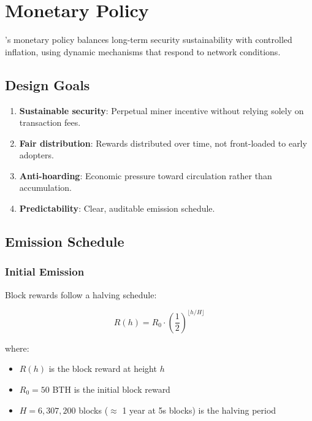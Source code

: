 
\section{Monetary Policy}
\label{sec:monetary}

\Botho's monetary policy balances long-term security sustainability with
controlled inflation, using dynamic mechanisms that respond to network
conditions.

\subsection{Design Goals}

\begin{enumerate}
  \item \textbf{Sustainable security}: Perpetual miner incentive without
    relying solely on transaction fees.
  \item \textbf{Fair distribution}: Rewards distributed over time, not
    front-loaded to early adopters.
  \item \textbf{Anti-hoarding}: Economic pressure toward circulation rather
    than accumulation.
  \item \textbf{Predictability}: Clear, auditable emission schedule.
\end{enumerate}

\subsection{Emission Schedule}

\subsubsection{Initial Emission}

Block rewards follow a halving schedule:

\begin{equation}
R(h) = R_0 \cdot \left(\frac{1}{2}\right)^{\lfloor h/H \rfloor}
\end{equation}

where:
\begin{itemize}
  \item $R(h)$ is the block reward at height $h$
  \item $R_0 = 50$ BTH is the initial block reward
  \item $H = 6{,}307{,}200$ blocks ($\approx$ 1 year at 5s blocks)
    is the halving period
\end{itemize}

